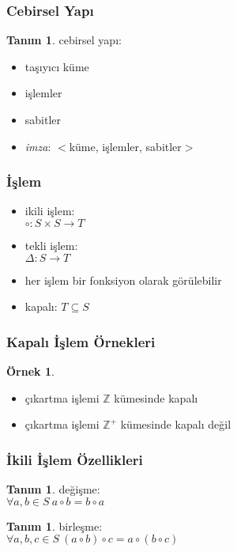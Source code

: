 \documentclass[dvipsnames]{beamer}
\theoremstyle{definition}
\newtheorem{tanim}[theorem]{Tanım}
\theoremstyle{example}
\newtheorem{ornek}[theorem]{Örnek}
\theoremstyle{plain}
\begin{document}
\begin{frame}
  \frametitle{Cebirsel Yapı}

  \begin{tanim}
    \alert{cebirsel yapı}:
    \begin{itemize}
      \item taşıyıcı küme
      \item işlemler
      \item sabitler
    \end{itemize}
  \end{tanim}

  \pause
  \begin{itemize}
    \item \emph{imza}: $<$küme, işlemler, sabitler$>$
  \end{itemize}
\end{frame}

\begin{frame}
  \frametitle{İşlem}

  \begin{itemize}
    \item ikili işlem:\\
      $\circ: S \times S \rightarrow T$

    \item tekli işlem:\\
      $\Delta: S \rightarrow T$

    \pause
    \medskip
    \item her işlem bir fonksiyon olarak görülebilir

    \pause
    \medskip
    \item \alert{kapalı}: $T \subseteq S$
  \end{itemize}
\end{frame}

\begin{frame}
  \frametitle{Kapalı İşlem Örnekleri}

  \begin{ornek}
    \begin{itemize}
      \item çıkartma işlemi $\mathbb{Z}$ kümesinde kapalı

      \pause
      \item çıkartma işlemi $\mathbb{Z^+}$ kümesinde kapalı değil
    \end{itemize}
  \end{ornek}
\end{frame}

\begin{frame}
  \frametitle{İkili İşlem Özellikleri}

  \begin{tanim}
    \alert{değişme}:\\
    $\forall a,b \in S~a \circ b = b \circ a$
  \end{tanim}

  \pause
  \begin{tanim}
    \alert{birleşme}:\\
    $\forall a,b,c \in S~(a \circ b) \circ c = a \circ (b \circ c)$
  \end{tanim}
\end{frame}
\end{document}
